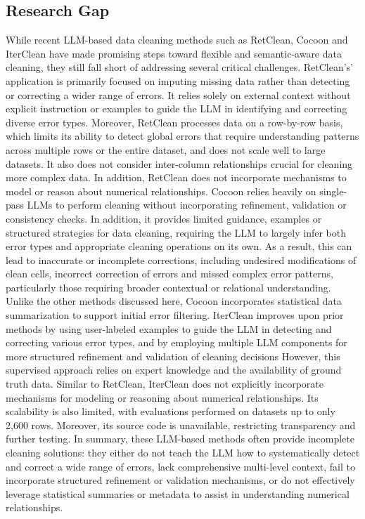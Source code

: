 \subsection{Research Gap}
While recent LLM-based data cleaning methods such as RetClean, Cocoon and IterClean have made promising steps toward flexible and semantic-aware data cleaning, they still fall short of addressing several critical challenges. 
RetClean's' application is primarily focused on imputing missing data rather than detecting or correcting a wider range of errors. 
It relies solely on external context without explicit instruction or examples to guide the LLM in identifying and correcting diverse error types.
Moreover, RetClean processes data on a row-by-row basis, which limits its ability to detect global errors that require understanding patterns across multiple rows or the entire dataset, and does not scale well to large datasets. 
It also does not consider inter-column relationships crucial for cleaning more complex data. 
In addition, RetClean does not incorporate mechanisms to model or reason about numerical relationships.
Cocoon relies heavily on single-pass LLMs to perform cleaning without incorporating refinement, validation or consistency checks. 
In addition, it provides limited guidance, examples or structured strategies for data cleaning, requiring the LLM to largely infer both error types and appropriate cleaning operations on its own. 
As a result, this can lead to inaccurate or incomplete corrections, including undesired modifications of clean cells, incorrect correction of errors and missed complex error patterns, particularly those requiring broader contextual or relational understanding.
Unlike the other methods discussed here, Cocoon incorporates statistical data summarization to support initial error filtering.
IterClean improves upon prior methods by using user-labeled examples to guide the LLM in detecting and correcting various error types, and by employing multiple LLM components for more structured refinement and validation of cleaning decisions
However, this supervised approach relies on expert knowledge and the availability of ground truth data. 
Similar to RetClean, IterClean does not explicitly incorporate mechanisms for modeling or reasoning about numerical relationships.
Its scalability is also limited, with evaluations performed on datasets up to only 2,600 rows. 
Moreover, its source code is unavailable, restricting transparency and further testing. 
\newline\newline
In summary, these LLM-based methods often provide incomplete cleaning solutions: they either do not teach the LLM how to systematically detect and correct a wide range of errors, lack comprehensive multi-level context, fail to incorporate structured refinement or validation mechanisms, or do not effectively leverage statistical summaries or metadata to assist in understanding numerical relationships. 

